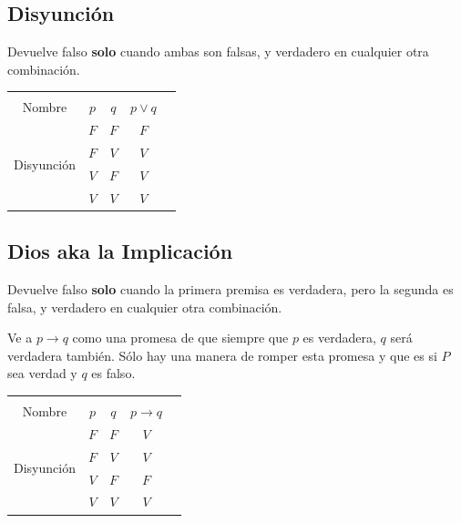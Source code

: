 \documentclass[12pt, fleqn]{report}                             %
\theoremstyle{break}                                            %
\begin{document}
            \subsection{Disyunción}

                Devuelve falso \textbf{solo} cuando ambas son falsas, y verdadero en cualquier
                otra combinación.\\

                \begin{tabular}{ |c|c|c|c|c| } 
                    \hline &&&\\
                    \large{Nombre} & $p$ & $q$ & $p \lor q$ \\[0.5em]
                    \hline
                    \multirow{4}{5em}{Disyunción}
                    & $F$ & $F$ & $F$ \\ \cline{2-4}
                    & $F$ & $V$ & $V$ \\ \cline{2-4}
                    & $V$ & $F$ & $V$ \\ \cline{2-4}
                    & $V$ & $V$ & $V$ \\ 
                    \hline
                \end{tabular}





            \clearpage
            \subsection{Dios aka la Implicación}

                Devuelve falso \textbf{solo} cuando la primera premisa es verdadera, pero la 
                segunda es falsa, y verdadero en cualquier otra combinación.

                Ve a $p \to q$ como una promesa de que siempre que $p$ es verdadera, $q$ será verdadera también.
                Sólo hay una manera de romper esta promesa y que es si $P$ sea verdad y $q$ es falso.\\


                \begin{tabular}{ |c|c|c|c|c| } 
                    \hline &&&\\
                    \large{Nombre} & $p$ & $q$ & $p \to q$ \\[0.5em]
                    \hline
                    \multirow{4}{5em}{Disyunción}
                    & $F$ & $F$ & $V$ \\ \cline{2-4}
                    & $F$ & $V$ & $V$ \\ \cline{2-4}
                    & $V$ & $F$ & $F$ \\ \cline{2-4}
                    & $V$ & $V$ & $V$ \\ 
                    \hline
                \end{tabular}\\[1.0em]
\end{document}

